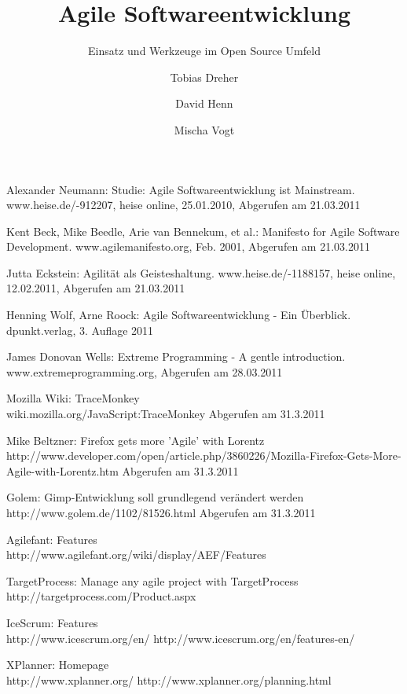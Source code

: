 \documentclass[german,english]{header}
\begin{document}

\title{Agile Softwareentwicklung}
\subtitle{Einsatz und Werkzeuge im Open Source Umfeld}
\author{Tobias Dreher\and David Henn\and Mischa Vogt}

\maketitle







\begin{thebibliography}{5}
Alexander Neumann:
Studie: Agile Softwareentwicklung ist Mainstream.
www.heise.de/-912207, heise online, 25.01.2010, Abgerufen am 21.03.2011

Kent Beck, Mike Beedle, Arie van Bennekum, et al.: 
Manifesto for Agile Software Development.
www.agilemanifesto.org, Feb. 2001, Abgerufen am 21.03.2011

Jutta Eckstein: 
Agilität als Geisteshaltung.
www.heise.de/-1188157, heise online, 12.02.2011, Abgerufen am 21.03.2011

Henning Wolf, Arne Roock: 
Agile Softwareentwicklung - Ein Überblick.
dpunkt.verlag, 3. Auflage 2011

James Donovan Wells: 
Extreme Programming - A gentle introduction.
www.extremeprogramming.org, Abgerufen am 28.03.2011

Mozilla Wiki:
TraceMonkey
\\wiki.mozilla.org/JavaScript:TraceMonkey Abgerufen am 31.3.2011

Mike Beltzner:
Firefox gets more 'Agile' with Lorentz
\\http://www.developer.com/open/article.php/3860226/Mozilla-Firefox-Gets-More-Agile-with-Lorentz.htm Abgerufen am 31.3.2011

Golem: Gimp-Entwicklung soll grundlegend verändert werden
http://www.golem.de/1102/81526.html Abgerufen am 31.3.2011

Agilefant: Features\\ 
http://www.agilefant.org/wiki/display/AEF/Features

TargetProcess: Manage any agile project with TargetProcess\\
http://targetprocess.com/Product.aspx

IceScrum: Features\\
http://www.icescrum.org/en/
http://www.icescrum.org/en/features-en/

XPlanner: Homepage\\
http://www.xplanner.org/
http://www.xplanner.org/planning.html

\end{thebibliography}
\end{document}
